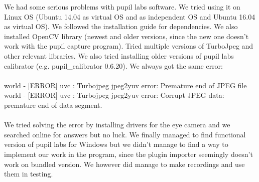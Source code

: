 \documentclass[a4paper,11pt]{article}
\begin{document}
We had some serious problems with pupil labs software. We tried using it on Linux OS (Ubuntu 14.04 as virtual OS and as independent OS and Ubuntu 16.04 as virtual OS). We followed the installation guide for dependencies. We also installed OpenCV library (newest and older versions, since the new one doesn't work with the pupil capture program). Tried multiple  versions of TurboJpeg and other relevant libraries. We also tried installing older versions of pupil labs calibrator (e.g. pupil\_calibrator 0.6.20). We always got the same error: \\  \\
world - [ERROR] uvc : Turbojpeg jpeg2yuv error: Premature end of JPEG file \\
world - [ERROR] uvc : Turbojpeg jpeg2yuv error: Corrupt JPEG data: premature end of data segment. \\ \\
We tried solving the error by installing drivers for the eye camera and we searched online for answers but no luck.
We finally managed to find functional version of pupil labs for Windows but we didn't manage to find a way to implement our work in the program, since the plugin importer seemingly doesn't work on bundled version. We however did manage to make recordings and use them in testing.
\end{document}
